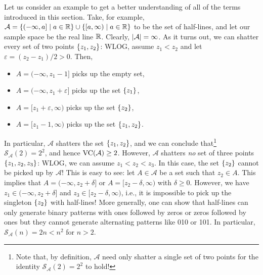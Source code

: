 Let us consider an example to get a better understanding of all of the terms introduced in this section. Take, for example, $\mathcal{A} = \set{(-\infty, a] \with a \in \R} \cup \set{[a, \infty) \with a \in \R}$ to be the set of half-lines, and let our sample space be the real line $\mathbb{R}$. Clearly, $\abs{\mathcal{A}} = \infty$. As it turns out, we can shatter every set of two points $\set{z_1, z_2}$: WLOG, assume $z_1 < z_2$ and let $\varepsilon = (z_2 - z_1)/2 > 0$. Then,
\begin{itemize}
    \item $A = (-\infty, z_1 - 1]$ picks up the empty set,

    \item $A = (-\infty, z_1 + \varepsilon]$ picks up the set $\set{z_1}$,

    \item $A = [z_1 + \varepsilon, \infty)$ picks up the set $\set{z_2}$,

    \item $A = [z_1 - 1, \infty)$ picks up the set $\set{z_1, z_2}$.
\end{itemize}
In particular, $\mathcal{A}$ shatters the set $\set{z_1, z_2}$, and we can conclude that\footnote{Note that, by definition, $\mathcal{A}$ need only shatter a single set of two points for the identity $\mathcal{S}_{\mathcal{A}}(2) = 2^2$ to hold!} $\mathcal{S}_{\mathcal{A}}(2) = 2^2$, and hence $\operatorname{VC}(\mathcal{A}) \geq 2$. However, $\mathcal{A}$ shatters \emph{no} set of three points $\set{z_1, z_2, z_3}$: WLOG, we can assume $z_1 < z_2 < z_3$. In this case, the set $\set{z_2}$ cannot be picked up by $\mathcal{A}$! This is easy to see: let $A \in \mathcal{A}$ be a set such that $z_2 \in A$. This implies that $A = (-\infty, z_2 + \delta]$ or $A = [z_2 - \delta, \infty)$ with $\delta \geq 0$. However, we have $z_1 \in (-\infty, z_2 + \delta]$ and $z_3 \in [z_2 - \delta, \infty)$, i.e., it is impossible to pick up the singleton $\set{z_2}$ with half-lines! More generally, one can show that half-lines can only generate binary patterns with ones followed by zeros or zeros followed by ones but they cannot generate alternating patterns like 010 or 101. In particular, $\mathcal{S}_{\mathcal{A}}(n) = 2n < n^2$ for $n > 2$.

